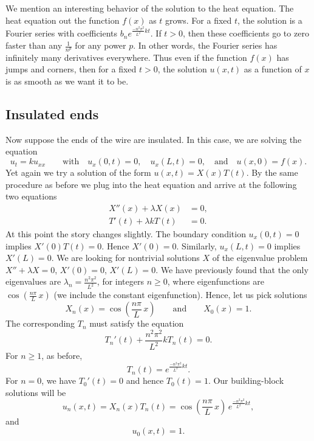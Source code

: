 We mention an interesting behavior of the solution to the heat equation.
The heat equation
 out the function $f(x)$ as $t$ grows.  For a fixed $t$,
the solution is a Fourier series with coefficients
$b_n e^{\frac{-n^2 \pi^2}{L^2} k t}$.  If $t > 0$, then these coefficients
go to zero faster than any $\frac{1}{n^p}$ for any power $p$.  In other
words, the Fourier series has infinitely many derivatives everywhere.
Thus even if the function $f(x)$ has jumps and corners, then for
a fixed $t > 0$, the solution
$u(x,t)$ as a function of $x$ is as smooth as we want it
to be.

\subsection{Insulated ends}

Now suppose the ends of the wire are insulated.  In this case, we are solving
the equation
\begin{equation*}
u_t = k u_{xx}
\qquad \text{with} \quad
u_x(0,t) = 0, \quad u_x(L,t) = 0,
\quad \text{and} \quad u(x,0) = f(x) .
\end{equation*}
Yet again we try a solution of the form $u(x,t) = X(x)T(t)$.  By the same
procedure as before we plug into the heat equation and arrive at the
following
two equations
\begin{align*}
X''(x) + \lambda X(x) &= 0 , \\
T'(t) + \lambda k T(t) &= 0 .
\end{align*}
At this point the story changes slightly.
The boundary condition $u_x(0,t) = 0$ implies $X'(0)T(t) = 0$.
Hence $X'(0) = 0$.  Similarly, $u_x(L,t) = 0$ implies $X'(L) = 0$.  We
are looking for nontrivial solutions $X$ of the eigenvalue problem
$X'' + \lambda X = 0$, $X'(0) = 0$, $X'(L) = 0$.  We have previously found that
the only eigenvalues are $\lambda_n = \frac{n^2 \pi^2}{L^2}$, for integers
$n \geq 0$,
where eigenfunctions are $\cos \left( \frac{n \pi}{L} \, x\right)$
(we include the constant
eigenfunction).  Hence, let us pick
solutions
\begin{equation*}
X_n (x) = \cos \left( \frac{n \pi}{L} \, x \right)
\qquad \text{and} \qquad
X_0 (x) = 1.
\end{equation*}
The corresponding $T_n$ must satisfy the equation
\begin{equation*}
T_n'(t) + \frac{n^2 \pi^2}{L^2} k T_n(t) = 0 .
\end{equation*}
For $n \geq 1$, as before,
\begin{equation*}
T_n(t) = e^{\frac{-n^2 \pi^2}{L^2} k t} .
\end{equation*}
For $n = 0$, we have $T_0'(t) = 0$ and hence $T_0(t) = 1$.
Our building-block solutions will be
\begin{equation*}
u_n(x,t) = X_n(x)T_n(t) =
\cos \left( \frac{n \pi}{L} \, x \right)
\, e^{\frac{-n^2 \pi^2}{L^2} k t} ,
\end{equation*}
and
\begin{equation*}
u_0(x,t) = 1 .
\end{equation*}

